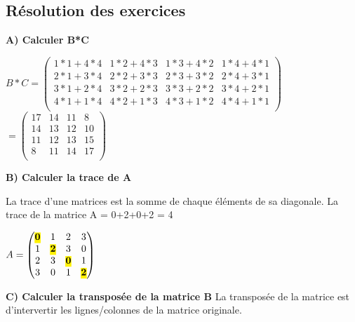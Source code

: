 \newpage

\subsection{Résolution des exercices}
\vspace{3mm} %
\textbf{A) Calculer B*C}
\vspace{10mm} %

$
B*C =
\begin{pmatrix}
  1*1+4*4 & 1*2+4*3 & 1*3+4*2 & 1*4+4*1 \\
  2*1+3*4 & 2*2+3*3 & 2*3+3*2 & 2*4+3*1 \\
  3*1+2*4 & 3*2+2*3 & 3*3+2*2 & 3*4+2*1 \\
  4*1+1*4 & 4*2+1*3 & 4*3+1*2 & 4*4+1*1 \\
\end{pmatrix}
$
\vspace{5mm} %
$
=
\begin{pmatrix}
  17 & 14 & 11 & 8 \\
  14 & 13 & 12 & 10 \\
  11 & 12 & 13 & 15 \\
  8 & 11 & 14 & 17 \\
\end{pmatrix}
$

\vspace{3mm} %
\textbf{B) Calculer la trace de A}
\vspace{5mm} %

La trace d'une matrices est la somme de chaque éléments de sa diagonale.
La trace de la matrice A = 0+2+0+2 = 4
\vspace{5mm} %

$
A =
\begin{pmatrix}
  \hl{\textbf{0}}  & 1 & 2 & 3 \\
  1 & \hl{\textbf{2}} & 3 & 0 \\
  2 & 3 & \hl{\textbf{0}} & 1 \\
  3 & 0 & 1 & \hl{\textbf{2}} \\
\end{pmatrix}
$

\vspace{6mm} %
\textbf{C) Calculer la transposée de la matrice B}
\vspace{4mm} %
La transposée de la matrice est d'intervertir les lignes/colonnes de la matrice originale.

